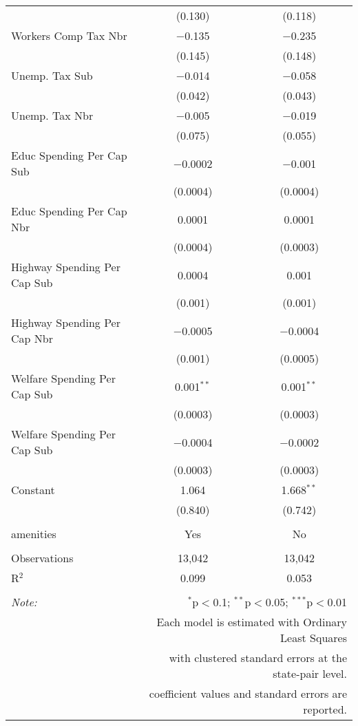 \begin{table}[!htbp]
\begin{tabular}{@{\extracolsep{5pt}}lcc}
  & (0.130) & (0.118) \\ 
  Workers Comp Tax Nbr & $-$0.135 & $-$0.235 \\ 
  & (0.145) & (0.148) \\ 
  Unemp. Tax Sub & $-$0.014 & $-$0.058 \\ 
  & (0.042) & (0.043) \\ 
  Unemp. Tax Nbr & $-$0.005 & $-$0.019 \\ 
  & (0.075) & (0.055) \\ 
  Educ Spending Per Cap Sub & $-$0.0002 & $-$0.001 \\ 
  & (0.0004) & (0.0004) \\ 
  Educ Spending Per Cap Nbr & 0.0001 & 0.0001 \\ 
  & (0.0004) & (0.0003) \\ 
  Highway Spending Per Cap Sub & 0.0004 & 0.001 \\ 
  & (0.001) & (0.001) \\ 
  Highway Spending Per Cap Nbr & $-$0.0005 & $-$0.0004 \\ 
  & (0.001) & (0.0005) \\ 
  Welfare Spending Per Cap Sub & 0.001$^{**}$ & 0.001$^{**}$ \\ 
  & (0.0003) & (0.0003) \\ 
  Welfare Spending Per Cap Sub & $-$0.0004 & $-$0.0002 \\ 
  & (0.0003) & (0.0003) \\ 
  Constant & 1.064 & 1.668$^{**}$ \\ 
  & (0.840) & (0.742) \\ 
 \hline \\[-1.8ex] 
amenities & Yes & No \\ 
\hline \\[-1.8ex] 
Observations & 13,042 & 13,042 \\ 
R$^{2}$ & 0.099 & 0.053 \\ 
\hline 
\hline \\[-1.8ex] 
\textit{Note:}  & \multicolumn{2}{r}{$^{*}$p$<$0.1; $^{**}$p$<$0.05; $^{***}$p$<$0.01} \\ 
 & \multicolumn{2}{r}{Each model is estimated with Ordinary Least Squares} \\ 
 & \multicolumn{2}{r}{with clustered standard errors at the state-pair level.} \\ 
 & \multicolumn{2}{r}{coefficient values and standard errors are reported.} \\ 
\end{tabular} 
\end{table} 
